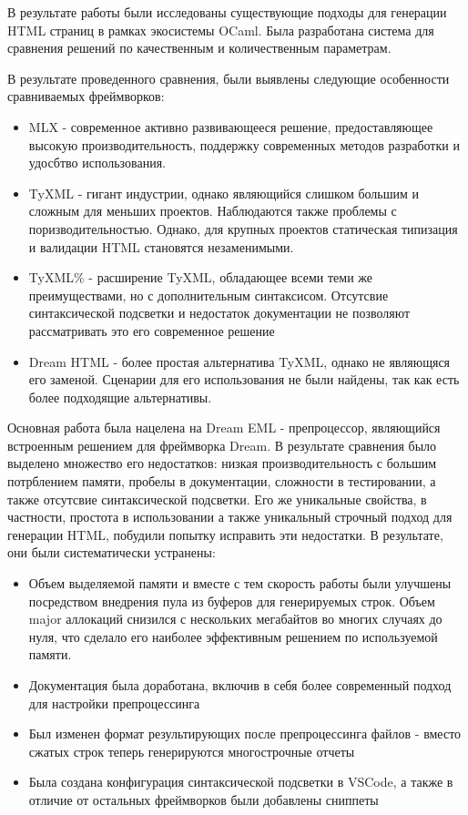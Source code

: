 В результате работы были исследованы существующие подходы для генерации HTML страниц в рамках экосистемы OCaml.
Была разработана система для сравнения решений по качественным и количественным параметрам.

В результате проведенного сравнения, были выявлены следующие особенности сравниваемых фреймворков:

\begin{itemize}
    \item MLX - современное активно развивающееся решение, предоставляющее высокую производительность, поддержку современных методов разработки и удосбтво использования.
    \item TyXML - гигант индустрии, однако являющийся слишком большим и сложным для меньших проектов. Наблюдаются также проблемы с поризводительностью. Однако, для крупных проектов статическая типизация и валидации HTML становятся незаменимыми.
    \item TyXML\% - расширение TyXML, обладающее всеми теми же преимуществами, но с дополнительным синтаксисом. Отсутсвие синтаксической подсветки и недостаток документации не позволяют рассматривать это его современное решение
    \item Dream HTML - более простая альтернатива TyXML, однако не являющяся его заменой. Сценарии для его использования не были найдены, так как есть более подходящие альтернативы.
\end{itemize}

Основная работа была нацелена на Dream EML - препроцессор, являющийся встроенным решением для фреймворка Dream.
В результате сравнения было выделено множество его недостатков: низкая производительность с большим потрблением памяти, пробелы в документации, сложности в тестировании, а также отсутсвие синтаксической подсветки.
Его же уникальные свойства, в частности, простота в использовании а также уникальный строчный подход для генерации HTML, побудили попытку исправить эти недостатки.
В результате, они были систематически устранены:
\begin{itemize}
    \item Объем выделяемой памяти и вместе с тем скорость работы были улучшены посредством внедрения пула из буферов для генерируемых строк. Объем major аллокаций снизился с нескольких мегабайтов во многих случаях до нуля, что сделало его наиболее эффективным решением по используемой памяти.
    \item Документация была доработана, включив в себя более современный подход для настройки препроцессинга
    \item Был изменен формат результирующих после препроцессинга файлов - вместо сжатых строк теперь генерируются многострочные отчеты
    \item Была создана конфигурация синтаксической подсветки в VSCode, а также в отличие от остальных фреймворков были добавлены сниппеты
\end{itemize}

